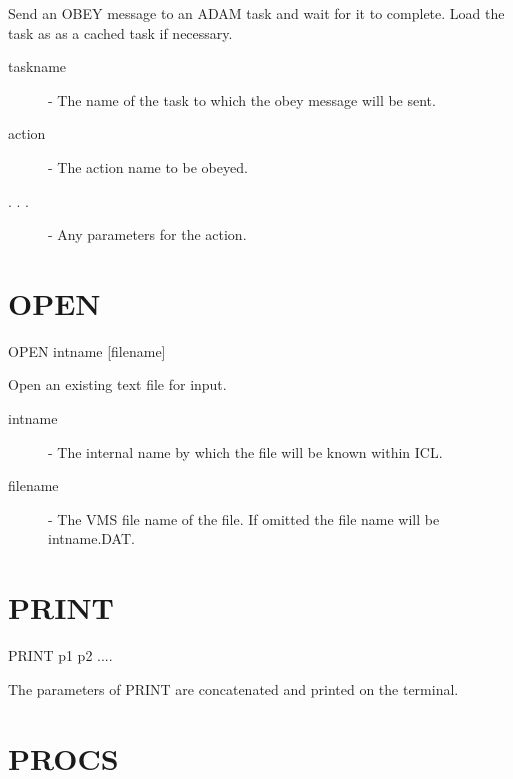 \documentclass[twoside,11pt]{report}
\newcommand{\xlabel}[1]{}
\begin{document}
 Send an OBEY message to an ADAM task and wait for it to complete. Load the
 task as as a cached task if necessary.

\begin{description}

 \item[taskname] - The name of the task to which the obey message will be sent.

 \item[action] - The action name to be obeyed.

 \item[. . .] - Any parameters for the action.

\end{description}

\section{\xlabel{OPEN}OPEN\label{OPEN}}
                                       
   OPEN \hspace{.5cm} intname \hspace{.5cm} [filename]

 Open an existing text file for input. 

\begin{description}

\item[intname]  -  The internal name by which the file will be known
                  within ICL.

\item[filename]  -  The VMS file name of the file. If omitted the
                  file name will be intname.DAT.

\end{description}

\section{\xlabel{PRINT}PRINT\label{PRINT}}

    PRINT  \hspace{.5cm}  p1 \hspace{.5cm} p2  ....

 The parameters of PRINT are concatenated and printed on the terminal.

\section{\xlabel{PROCS}PROCS\label{PROCS}}
\end{document}
